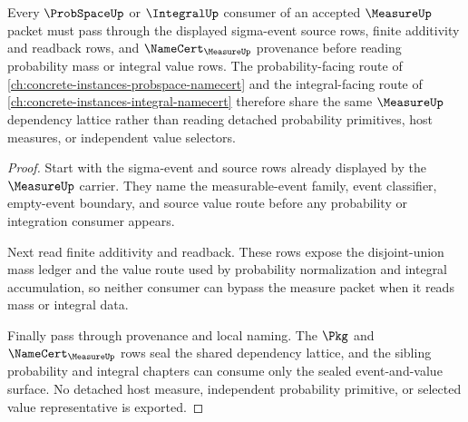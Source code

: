 \begin{theorem}
\label{thm:measure-probability-sigma-dependency-forward-link}
Every $\ProbSpaceUp$ or $\IntegralUp$ consumer of an accepted $\MeasureUp$ packet must pass through the displayed sigma-event source rows, finite additivity and readback rows, and $\NameCert_{\MeasureUp}$ provenance before reading probability mass or integral value rows. The probability-facing route of \autoref{ch:concrete-instances-probspace-namecert} and the integral-facing route of \autoref{ch:concrete-instances-integral-namecert} therefore share the same $\MeasureUp$ dependency lattice rather than reading detached probability primitives, host measures, or independent value selectors.
\end{theorem}
\begin{proof}
Start with the sigma-event and source rows already displayed by the $\MeasureUp$ carrier. They name the measurable-event family, event classifier, empty-event boundary, and source value route before any probability or integration consumer appears.

Next read finite additivity and readback. These rows expose the disjoint-union mass ledger and the value route used by probability normalization and integral accumulation, so neither consumer can bypass the measure packet when it reads mass or integral data.

Finally pass through provenance and local naming. The $\Pkg$ and $\NameCert_{\MeasureUp}$ rows seal the shared dependency lattice, and the sibling probability and integral chapters can consume only the sealed event-and-value surface. No detached host measure, independent probability primitive, or selected value representative is exported.
\end{proof}
